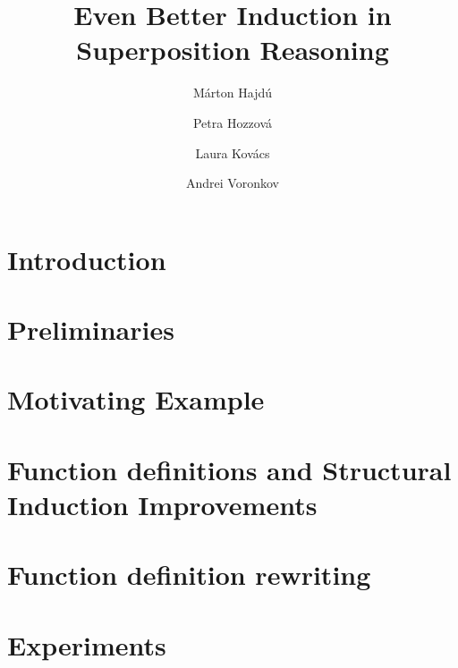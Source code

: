 \documentclass[runningheads]{llncs}
\begin{document}
%
\title{Even Better Induction in Superposition Reasoning}
%
\titlerunning{ }
%
\author{M\'arton Hajd\'{u} \and Petra Hozzov\'a \and
  Laura Kov\'acs \and Andrei Voronkov}
%
\authorrunning{ }
%

%

\maketitle              %
%
\begin{abstract}
\end{abstract}

\section{Introduction}


\section{Preliminaries}


\section{Motivating Example}
\label{sec:motivating}


\section{Function definitions and Structural Induction Improvements}
\label{sec:fn_defs}


\section{Function definition rewriting}
\label{sec:fn_def_rewriting}


\section{Experiments}
\label{sec:experiments}

\end{document}
